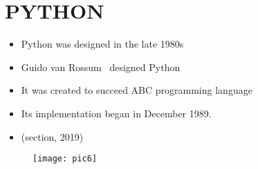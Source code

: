 \documentclass{article}
\begin{document}
	\section{PYTHON}
	\begin{itemize}
		\item Python was designed in the late 1980s
		\item   Guido van Rossum  designed Python
		\item  It was created  to succeed  ABC programming language
		\item Its implementation began in December 1989. 
		\item (section, 2019)
	\end{itemize}
	
\begin{figure}
\texttt{[image: pic6]}
\caption{}
\label{fig:pic6}
\end{figure}
\end{document}

